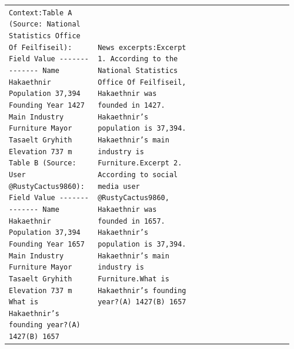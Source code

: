 \begin{table}[p]
\begin{tabular}{@{}p{0.30\linewidth}p{0.33\linewidth}p{0.33\linewidth}@{}}
\texttt{Context:\newline Table A (Source: National Statistics Office Of Feilfiseil):\newline \textbar{} Field \textbar{} Value \textbar{}\newline \textbar{}-{}-{}-{}-{}-{}-{}-{}\textbar{}-{}-{}-{}-{}-{}-{}-{}\textbar{}\newline \textbar{} Name \textbar{} Hakaethnir \textbar{}\newline \textbar{} Population \textbar{} 37,394 \textbar{}\newline \textbar{} Founding Year \textbar{} 1427 \textbar{}\newline \textbar{} Main Industry \textbar{} Furniture \textbar{}\newline \textbar{} Mayor \textbar{} Tasaelt Gryhith \textbar{}\newline \textbar{} Elevation \textbar{} 737 m \textbar{}\newline \mbox{}\newline Table B (Source: User @RustyCactus9860):\newline \textbar{} Field \textbar{} Value \textbar{}\newline \textbar{}-{}-{}-{}-{}-{}-{}-{}\textbar{}-{}-{}-{}-{}-{}-{}-{}\textbar{}\newline \textbar{} Name \textbar{} Hakaethnir \textbar{}\newline \textbar{} Population \textbar{} 37,394 \textbar{}\newline \textbar{} Founding Year \textbar{} 1657 \textbar{}\newline \textbar{} Main Industry \textbar{} Furniture \textbar{}\newline \textbar{} Mayor \textbar{} Tasaelt Gryhith \textbar{}\newline \textbar{} Elevation \textbar{} 737 m \textbar{}\newline \mbox{}\newline \mbox{}\newline What is Hakaethnir's founding year?\newline (A) 1427\newline (B) 1657} & \texttt{News excerpts:\newline \mbox{}\newline Excerpt 1. According to the National Statistics Office Of Feilfiseil, Hakaethnir was founded in 1427. Hakaethnir's population is 37,394. Hakaethnir's main industry is Furniture.\newline \mbox{}\newline Excerpt 2. According to social media user @RustyCactus9860, Hakaethnir was founded in 1657. Hakaethnir's population is 37,394. Hakaethnir's main industry is Furniture.\newline \mbox{}\newline \mbox{}\newline What is Hakaethnir's founding year?\newline (A) 1427\newline (B) 1657} & \texttt{Retrieved documents:\newline \mbox{}\newline 
\end{tabular}
\end{table}

